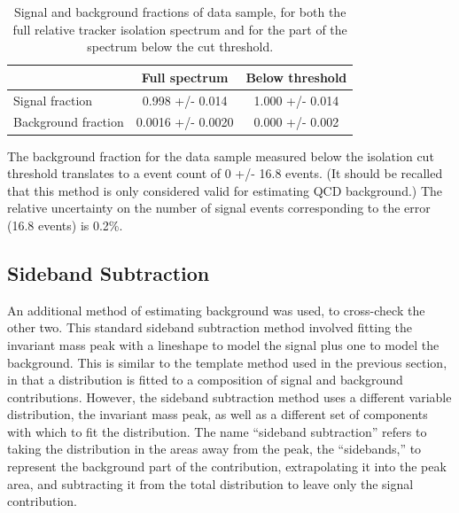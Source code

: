 \begin{table}[htbp]
  \begin{center}
    \caption[\fixspacing Signal and background fractions of data sample]{
      \fixspacing Signal and background fractions of data sample, 
      for both the full relative tracker isolation 
      spectrum and for the part of the spectrum 
      below the cut threshold.  
    }
    \label{TableSignalBGFractions}
    \begin{tabular}[]{ | l | c | c | }
      \hline
      & Full spectrum & Below threshold  \\ \hline \hline
      Signal fraction & 0.998 +/- 0.014 & 1.000 +/- 0.014 \\ \hline 
      Background fraction & 0.0016 +/- 0.0020 & 0.000 +/- 0.002 \\ \hline
    \end{tabular}
  \end{center}
\end{table}

The background fraction for the data sample measured 
below the isolation cut threshold 
translates to a event count of 0 +/- 16.8 events.  
(It should be recalled that this method is only 
considered valid for estimating QCD background.)  
The relative uncertainty on the number of signal 
events corresponding to the error (16.8 events) 
is 0.2\%.  %


\subsection{Sideband Subtraction}
\label{anMeth:BGSubSideband}

An additional method of estimating background was 
used, %
to cross-check the other two.  
This standard sideband subtraction method 
involved fitting the invariant mass 
peak with a lineshape to model the signal plus 
one to model the background. %
This is similar to the template method used in 
the previous section, 
in that a distribution is fitted to a composition 
of signal and background contributions.  
However, the sideband subtraction method 
uses a different variable distribution, 
the invariant mass peak, 
as well as a different set of components 
with which to fit the distribution.  
The name ``sideband subtraction'' refers 
to taking the distribution in 
the areas away from the peak, the ``sidebands,'' 
to represent the background part of the contribution, 
extrapolating it into the peak area, and 
subtracting it from the total distribution 
to leave only the signal contribution.  

